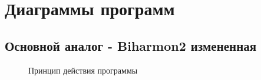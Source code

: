 \chapter{Диаграммы программ}
\section{Основной аналог - Biharmon2 измененная}
%
\begin{figure}[hp]
\begin{small}

\end{small}
\caption{Принцип действия программы}
\end{figure}

